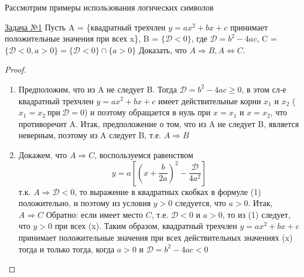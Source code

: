 \documentclass[a4paper,12pt]{article} %
\begin{document}
Рассмотрим примеры использования логических символов

\label{Problem1}
\underline{Задача №1}
Пусть A = \{квадратный трехчлен $y = ax^2 + bx +c$ принимает положительные значения при всех x\}, B = $\{\mathscr D < 0\}$, где $\mathscr D = b^2 -4ac$, C = $\{\mathscr D < 0, a>0\}=\{\mathscr D < 0\} \cap \{a>0\}$ Доказать, что $A \Rightarrow B, A \Leftrightarrow C.$
\begin{proof}
\begin{enumerate}
\item Предположим, что из A не следует B. Тогда $\mathscr D = b^2 - 4ac \geqslant 0$,  в этом сл-е квадратный трехчлен $y = ax^2 + bx + c$ имеет действительные корни $x_1$ и $x_2$ ($x_1 = x_2\ при\ \mathscr D = 0$) и поэтому обращается в нуль при $x= x_1$ и $x=x_2$, что противоречит A.
Итак, предположение о том, что из A не следует B, является неверным, поэтому из A следует B, т.е. $A \Rightarrow B$
\item Докажем, что $A \Rightarrow C$, воспользуемся равенством
\begin{equation}
y = a\left[ \left(x + \dfrac b{2a} \right)^2 - \dfrac{\mathscr D}{4a^2} \right]
\end{equation}
т.к. $A\Rightarrow {\mathscr D < 0}$, то выражение в квадратных скобках в формуле (1) положительно, и поэтому из условия $y > 0$ следуется, что $a>0$. Итак, $A\Rightarrow C$ \newline
Обратно: если имеет место $C$, т.е. $\mathscr D < 0$ и $a>0$, то из (1) следует, что $y > 0$ при всех (x). Таким образом, квадратный трехчлен $y = ax^2 +bx + c$ принимает положительные значения при всех
действительных значениях (x) тогда и только тогда, когда $a>0$ и $\mathscr D = b^2-4ac < 0$

\end{enumerate}
\end{proof}
\end{document}

